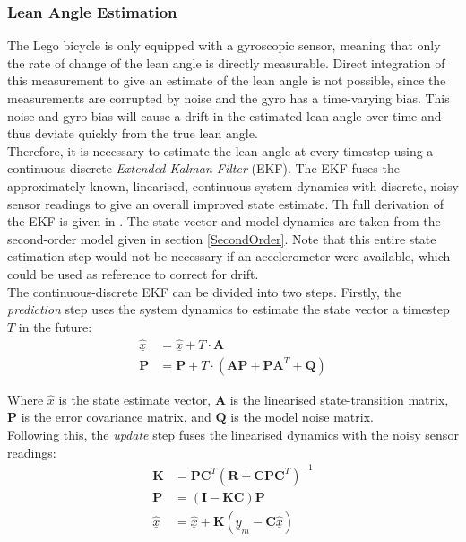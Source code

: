 \subsubsection{Lean Angle Estimation}
The Lego bicycle is only equipped with a gyroscopic sensor, meaning that only the rate of change of the lean angle is directly measurable. Direct integration of this measurement to give an estimate of the lean angle is not possible, since the measurements are corrupted by noise and the gyro has a time-varying bias. This noise and gyro bias will cause a drift in the estimated lean angle over time and thus deviate quickly from the true lean angle. \\

Therefore, it is necessary to estimate the lean angle at every timestep using a continuous-discrete \textit{Extended Kalman Filter} (EKF). The EKF fuses the approximately-known, linearised, continuous system dynamics with discrete, noisy sensor readings to give an overall improved state estimate. Th full derivation of the EKF is given in \cite{smalluav}. The state vector and model dynamics are taken from the second-order model given in section \ref{SecondOrder}. Note that this entire state estimation step would not be necessary if an accelerometer were available, which could be used as reference to correct for drift. \\

The continuous-discrete EKF can be divided into two steps. Firstly, the \textit{prediction} step uses the system dynamics to estimate the state vector a timestep $T$ in the future:
\begin{align*}
\hat{\underline{x}} &= \hat{\underline{x}} + T \cdot \mathbf{A} \\
\mathbf{P} &= \mathbf{P} + T \cdot (\mathbf{A P} + \mathbf{P} \mathbf{A}^T + \mathbf{Q})
\end{align*}

Where $\hat{\underline{x}}$ is the state estimate vector, $\mathbf{A}$ is the linearised state-transition matrix, $\mathbf{P}$ is the error covariance matrix, and $\mathbf{Q}$ is the model noise matrix. \\

Following this, the \textit{update} step fuses the linearised dynamics with the noisy sensor readings:
\begin{align*}
\mathbf{K} &= \mathbf{P} \mathbf{C}^T (\mathbf{R} + \mathbf{C} \mathbf{P} \mathbf{C}^T)^{-1} \\
\mathbf{P} &= (\mathbf{I} - \mathbf{K C}) \mathbf{P} \\
\hat{\underline{x}} &= \hat{\underline{x}} + \mathbf{K} (\underline{y}_m - \mathbf{C} \hat{\underline{x}})
\end{align*}

